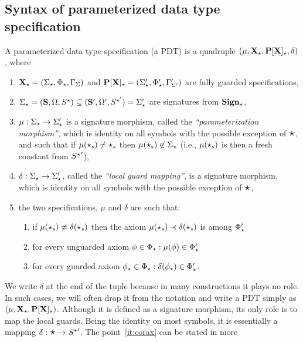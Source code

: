 \subsection{Syntax of parameterized data type specification}
\begin{definition}\label{def:parametersyntax}
A parameterized data type specification (a PDT) is a
 quadruple $(\mu,{\bf X_\star},{\bf P[X]_\star},\delta)$,
where
\begin{enumerate}\MyLPar
\item 
${\bf X_\star}=(\Sigma_\star,\Phi_\star, \Gamma_\Sigma)$ and ${\bf P[X]_\star} =
 (\Sigma'_{\star},\Phi'_{\star}, \Gamma'_{\Sigma'})$ are fully guarded specifications,
\item 
$\Sigma_\star=({\bf S},\Omega,S^\star)\subseteq
({\bf S}',\Omega',S^{\star'})=\Sigma'_\star$ are signatures from ${\bf Sign_\star}$, 
\item 
$\mu:\Sigma_\star\to \Sigma'_\star$ is a signature morphism, called the {\em
``parameterization morphism''}, which is identity on all symbols with the
possible exception of $\mbox{\Large{$\star$}}$, and such that if $\mu(\star_s)\not=\star_s$
then $\mu(\star_s)\not\in\Sigma_\star$ (i.e., $\mu(\star_s)$ is then a fresh
constant from ${S^\star}'$),
\item 
$\delta:\Sigma_\star\to\Sigma'_\star$, called the {\em ``local guard mapping''}, is 
a signature morphism, which is identity on all symbols with the
possible exception of $\mbox{\Large{$\star$}}$,
\item\label{it:rel}
 the two specifications, $\mu$ and $\delta$ are such that:
\begin{enumerate}
\item\label{it:sat} if $\mu(\star_s)\not=\delta(\star_s)$ then the axiom
$\mu(\star_s)\prec\delta(\star_s)$ is among $\Phi'_\star$
\item\label{it:unguard} for every unguarded axiom $\phi\in\Phi_\star:\mu(\phi)\in\Phi'_\star$
\item\label{it:corax} for every guarded axiom  $\phi_\star\in\Phi_\star:
\delta(\phi_\star)\in\Phi'_\star$.
\end{enumerate}
\end{enumerate}
\end{definition}
%
We write $\delta$ at the end of the tuple because in many constructions it
plays no role. In such cases, we will often drop it from the notation and
write a PDT simply as $(\mu,{\bf X_\star},{\bf P[X]_\star})$. Although it is defined as a signature morphism,
its only role is to map the local guards. Being  the identity on most
symbols, it is essentially a mapping
$\delta:\mbox{\Large{$\star$}}\to{S^\star}'$. The point~\ref{it:corax} can be stated in more
